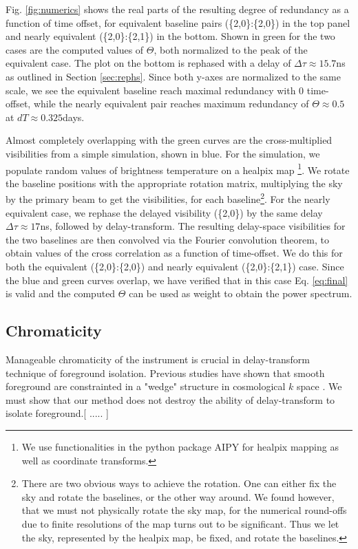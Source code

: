 \documentclass[twocolumn,apj,numberedappendix]{emulateapj}
\renewcommand\[{\begin{equation}}
\renewcommand\]{\end{equation}}
\begin{document}
Fig. \ref{fig:numerics} shows the real parts of the resulting degree of redundancy as a function of time offset, for equivalent baseline pairs (\{2,0\}:\{2,0\}) in the top panel and nearly equivalent (\{2,0\}:\{2,1\}) in the bottom. Shown in green for the two cases are the computed values of $\Theta$, both normalized to the peak of the equivalent case. The plot on the bottom is rephased with a delay of $\Delta\tau\approx15.7$ns as outlined in Section \ref{sec:rephs}. Since both y-axes are normalized to the same scale, we see the equivalent baseline reach maximal redundancy with 0 time-offset, while the nearly equivalent pair reaches maximum redundancy of $\Theta\approx0.5$ at $dT\approx0.325$days. 

Almost completely overlapping with the green curves are the cross-multiplied visibilities from a simple simulation, shown in blue. For the simulation, we populate random values of brightness temperature
on a healpix map \citep{Heal, HealPrimer} \footnote{We use functionalities in the python package AIPY for healpix mapping
as well as coordinate transforms. }. We rotate the baseline positions with
the appropriate rotation matrix, multiplying the sky by the primary beam to get the visibilities, for each
baseline\footnote{There are two obvious ways to achieve the rotation. One
can either fix the sky and rotate the baselines, or the other way
around. We found however, that we must not physically rotate the sky
map, for the numerical round-offs due to finite resolutions of the
map turns out to be significant. Thus we let the sky, represented
by the healpix map, be fixed, and rotate the baselines. }. For the nearly equivalent case, we rephase the delayed visibility (\{2,0\}) by the same delay $\Delta\tau\approx17$ns, followed by delay-transform. The resulting delay-space visibilities for the two baselines are then convolved
via the Fourier convolution theorem, to obtain values of the cross
correlation as a function of time-offset.   We do this for both the equivalent (\{2,0\}:\{2,0\}) and nearly equivalent (\{2,0\}:\{2,1\}) case.
Since the blue and green curves overlap, we have verified that in this case Eq. \eqref{eq:final} is valid and the computed $\Theta$ can be used as weight to obtain the power spectrum. 


\subsection{Chromaticity \label{sec:chromaticity}}
Manageable chromaticity of the instrument is crucial in delay-transform technique of foreground isolation. Previous studies have shown that smooth foreground are constrainted in a "wedge" structure in cosmological $k$ space \citep{wedge1, wedge2}. We must show that our method does not destroy the ability of delay-transform to isolate foreground.[ ..... ]
\end{document}
